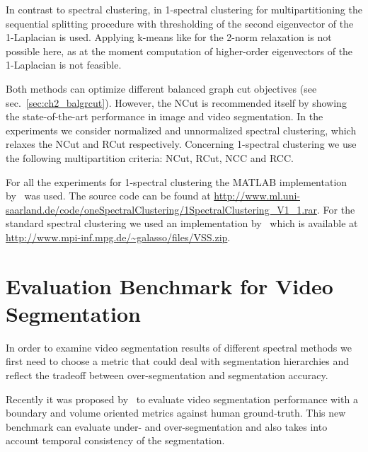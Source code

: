 In contrast to spectral clustering, in 1-spectral clustering for multipartitioning the sequential splitting procedure with thresholding of the second eigenvector of the 1-Laplacian is used.
Applying k-means like for the 2-norm relaxation is not possible here, as at the moment computation of higher-order eigenvectors of the 1-Laplacian is not feasible.

Both methods can optimize different balanced graph cut objectives (see sec.~\ref{sec:ch2_balgrcut}). However, the NCut is recommended itself by showing the state-of-the-art performance in image and video segmentation.
In the experiments we consider normalized and unnormalized spectral clustering, which relaxes the NCut and RCut respectively. 
Concerning 1-spectral clustering we use the following multipartition criteria: NCut, RCut, NCC and RCC.

For all the experiments for 1-spectral clustering the MATLAB implementation by~\cite{Buhler09} was used. The source code can be found at
\url{http://www.ml.uni-saarland.de/code/oneSpectralClustering/1SpectralClustering_V1_1.rar}. For the standard spectral clustering we used
an implementation by~\cite{GalassoCS12} which is available at \url{http://www.mpi-inf.mpg.de/~galasso/files/VSS.zip}.
\section{Evaluation Benchmark for Video Segmentation}
\label{ch4:bench}
In order to examine video segmentation results of different spectral methods we first need to choose a metric that could deal with segmentation hierarchies and reflect the tradeoff between over-segmentation and segmentation accuracy.

Recently it was proposed by~\cite{Galasso13} to evaluate video segmentation performance with a boundary and volume oriented metrics against human ground-truth.  
This new benchmark can evaluate under- and over-segmentation and also takes into account temporal consistency of the segmentation. 
